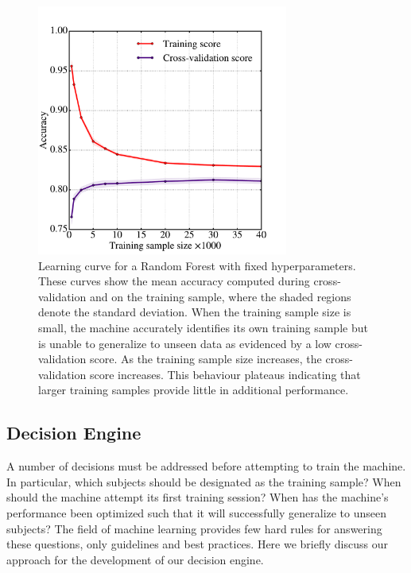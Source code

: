 \documentclass[twocolumn,  trackchanges,]{aastex6}%
\begin{document}
\begin{figure}[t!]
\includegraphics[width=3.25in]{f6.pdf}
\caption{Learning curve for a Random Forest with fixed hyperparameters. These curves show the mean accuracy computed during cross-validation and on the training sample, where the shaded regions denote the standard deviation. When the training sample size is small, the machine accurately identifies its own training sample but is unable to generalize to unseen data as evidenced by a low cross-validation score. As the training sample size increases, the cross-validation score increases. This behaviour plateaus indicating that larger training samples provide little in additional performance. \label{fig: learning curve}}
\end{figure}


\subsection{Decision Engine}\label{sec: decision engine}
A number of decisions must be addressed before attempting to train the machine. 
In particular, which subjects should be designated as the training sample? 
When should the machine attempt its first training session? 
When has the machine's performance been optimized such that it will successfully
generalize to unseen subjects? The field of machine learning provides few hard rules 
for answering these questions, only guidelines and best practices. 
Here we briefly discuss our approach for the development of our decision engine.
\end{document}
